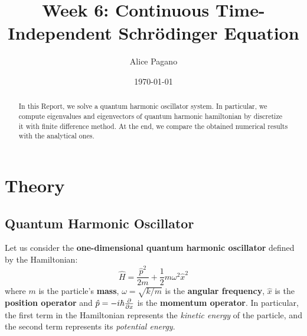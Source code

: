 \documentclass[rmp,10pt,onecolumn,fleqn,notitlepage]{revtex4-1}
\begin{document}
\title{Week 6: Continuous Time-Independent Schrödinger Equation}
\author{Alice Pagano}
\date{\today}

\begin{abstract}
In this Report, we solve a quantum harmonic oscillator system. In particular, we compute eigenvalues and eigenvectors of quantum harmonic hamiltonian by discretize it with finite difference method. At the end, we compare the obtained numerical results with the analytical ones.
\end{abstract}

\maketitle


\section{Theory}

\subsection{Quantum Harmonic Oscillator}

Let us consider the \textbf{one-dimensional quantum harmonic oscillator} defined by the Hamiltonian:
\begin{equation}
  \hat{H} = \frac{\hat{p}^2}{2m} +\frac{1}{2} m \omega ^2 \hat{x}^2
\end{equation}
where \( m \) is the particle's \textbf{mass}, \( \omega = \sqrt{k/m}  \) is the \textbf{angular frequency}, \( \hat{x}  \) is the \textbf{position operator} and \( \hat{p} = - i \hbar \pdv{}{x}  \) is the \textbf{momentum operator}.
In particular, the first term in the Hamiltonian represents the \emph{kinetic energy} of the particle, and the second term represents its \emph{potential energy}.
\end{document}
